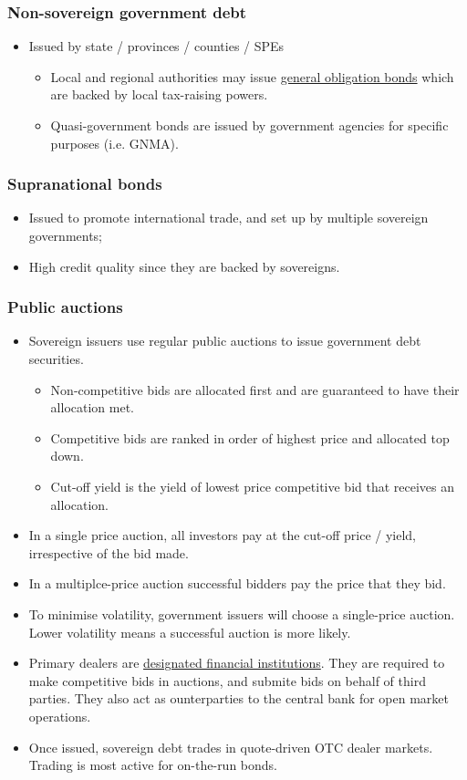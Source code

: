 \documentclass[../notes_compiled.tex]{subfiles}
\begin{document}
\subsubsection{Non-sovereign government debt}
\begin{itemize}
\item Issued by state / provinces / counties / SPEs
\begin{itemize}
\item Local and regional authorities may issue \underline{general obligation bonds} which are backed by local tax-raising powers.
\item Quasi-government bonds are issued by government agencies for specific purposes (i.e. GNMA).
\end{itemize}
\end{itemize}

\subsubsection{Supranational bonds}
\begin{itemize}
\item Issued to promote international trade, and set up by multiple sovereign governments;
\item High credit quality since they are backed by sovereigns.
\end{itemize}

\subsubsection{Public auctions}
\begin{itemize}
\item Sovereign issuers use regular public auctions to issue government debt securities.
\begin{itemize}
\item Non-competitive bids are allocated first and are guaranteed to have their allocation met.
\item Competitive bids are ranked in order of highest price and allocated top down.
\item Cut-off yield is the yield of lowest price competitive bid that receives an allocation.
\end{itemize}
\item In a single price auction, all investors pay at the cut-off price / yield, irrespective of the bid made.
\item In a multiplce-price auction successful bidders pay the price that they bid.
\item To minimise volatility, government issuers will choose a single-price auction. Lower volatility means a successful auction is more likely.
\item Primary dealers are \underline{designated financial institutions}. They are required to make competitive bids in auctions, and submite bids on behalf of third parties. They also act as ounterparties to the central bank for open market operations.
\item Once issued, sovereign debt trades in quote-driven OTC dealer markets. Trading is most active for on-the-run bonds.
\end{itemize}
\end{document}
